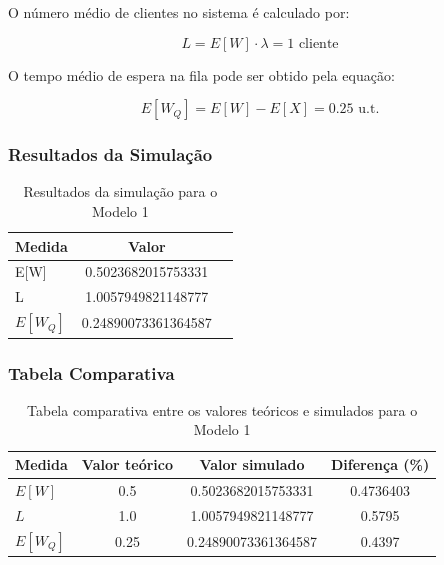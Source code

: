 \documentclass{article}
\begin{document}
O número médio de clientes no sistema é calculado por:

\[
L = {E[W]}\cdot{\lambda} = 1 \text{ cliente}
\]

O tempo médio de espera na fila pode ser obtido pela equação:

\[
E[W_Q] = E[W] - E[X] = 0.25 \text{ u.t.}
\]

\subsubsection{Resultados da Simulação}

\begin{table}[H]
    \centering
    \begin{tabular}{|l|c|c|}
        \hline
        \textbf{Medida} & \textbf{Valor}\\
        \hline
        E[W] & 0.5023682015753331 \\
        \hline
        L & 1.0057949821148777\\
        \hline
        $E[W_Q]$ & 0.24890073361364587\\
        \hline
    \end{tabular}
    \caption{Resultados da simulação para o Modelo 1}
    \label{tab:simulacao-modelo1}
\end{table}


\subsubsection{Tabela Comparativa}

\begin{table}[H]
    \centering
    \begin{tabular}{|l|c|c|c|}
        \hline
        \textbf{Medida} & \textbf{Valor teórico} & \textbf{Valor simulado} & \textbf{Diferença (\%)} \\
        \hline
        $E[W]$ & 0.5 & 0.5023682015753331 & 0.4736403 \\
        \hline
        $L$ & 1.0 & 1.0057949821148777 & 0.5795 \\
        \hline
        $E[W_Q]$ & 0.25 & 0.24890073361364587 & 0.4397 \\
        \hline
    \end{tabular}
    \caption{Tabela comparativa entre os valores teóricos e simulados para o Modelo 1}
    \label{tab:comparacao-modelo1}
\end{table}
\end{document}

